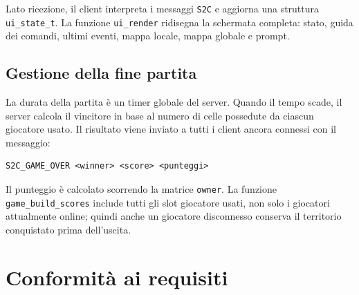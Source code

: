 \documentclass[11pt,a4paper]{article}
\begin{document}
Lato ricezione, il client interpreta i messaggi \texttt{S2C} e aggiorna una
struttura \texttt{ui\_state\_t}. La funzione \texttt{ui\_render} ridisegna la
schermata completa: stato, guida dei comandi, ultimi eventi, mappa locale,
mappa globale e prompt.

\subsection{Gestione della fine partita}

La durata della partita è un timer globale del server. Quando il tempo scade,
il server calcola il vincitore in base al numero di celle possedute da ciascun
giocatore usato. Il risultato viene inviato a tutti i client ancora connessi con
il messaggio:

\begin{lstlisting}[style=textstyle]
S2C_GAME_OVER <winner> <score> <punteggi>
\end{lstlisting}

Il punteggio è calcolato scorrendo la matrice \texttt{owner}. La funzione
\texttt{game\_build\_scores} include tutti gli slot giocatore usati, non solo i
giocatori attualmente online; quindi anche un giocatore disconnesso conserva il
territorio conquistato prima dell'uscita.

\section{Conformità ai requisiti}
\end{document}
